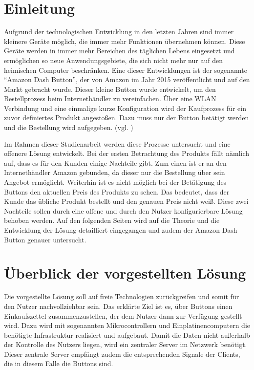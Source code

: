 \documentclass[ngerman]{scrartcl} %
\begin{document}
\tableofcontents
\newpage
 
\section{Einleitung}        
\label{sec:Einleitung-1}       
Aufgrund der technologischen Entwicklung in den letzten Jahren sind immer kleinere Geräte möglich, die immer mehr Funktionen übernehmen können. Diese Geräte werden in immer mehr Bereichen des täglichen Lebens eingesetzt und ermöglichen so neue Anwendungsgebiete, die sich nicht mehr nur auf den heimischen Computer beschränken. Eine dieser Entwicklungen ist der sogenannte ``Amazon Dash Button'', der von Amazon im Jahr 2015 veröffentlicht und auf den Markt gebracht wurde. 
Dieser kleine Button wurde entwickelt, um den Bestellprozess beim Internethändler zu vereinfachen. Über eine WLAN Verbindung und eine einmalige kurze Konfiguration wird der Kaufprozess für ein zuvor definiertes Produkt angestoßen. Dazu muss nur der Button betätigt werden und die Bestellung wird aufgegeben. (vgl. \cite{Amazon.})

Im Rahmen dieser Studienarbeit werden diese Prozesse untersucht und eine offenere Lösung entwickelt. Bei der ersten Betrachtung des Produkts fällt nämlich auf, dass es für den Kunden einige Nachteile gibt. Zum einen ist er an den Internethändler Amazon gebunden, da dieser nur die Bestellung über sein Angebot ermöglicht. Weiterhin ist es nicht möglich bei der Betätigung des Buttons den aktuellen Preis des Produkts zu sehen. Das bedeutet, dass der Kunde das übliche Produkt bestellt und den genauen Preis nicht weiß. Diese zwei Nachteile sollen durch eine offene und durch den Nutzer konfigurierbare Lösung behoben werden. Auf den folgenden Seiten wird auf die Theorie und die Entwicklung der Lösung detailliert eingegangen und zudem der Amazon Dash Button genauer untersucht.

\newpage
\section{Überblick der vorgestellten Lösung}
\label{sec:Überblick der vorgestellten Lösung-1}
Die vorgestellte Lösung soll auf freie Technologien zurückgreifen und somit für den Nutzer nachvollziehbar sein. Das erklärte Ziel ist es, über Buttons einen Einkaufszettel zusammenzustellen, der dem Nutzer dann zur Verfügung gestellt wird. Dazu wird mit sogenannten Mikrocontrollern und Einplatinencomputern die benötigte Infrastruktur realisiert und aufgebaut. Damit die Daten nicht außerhalb der Kontrolle des Nutzers liegen, wird ein zentraler Server im Netzwerk benötigt. Dieser zentrale Server empfängt zudem die entsprechenden Signale der Clients, die in diesem Falle die Buttons sind. 
\end{document}
